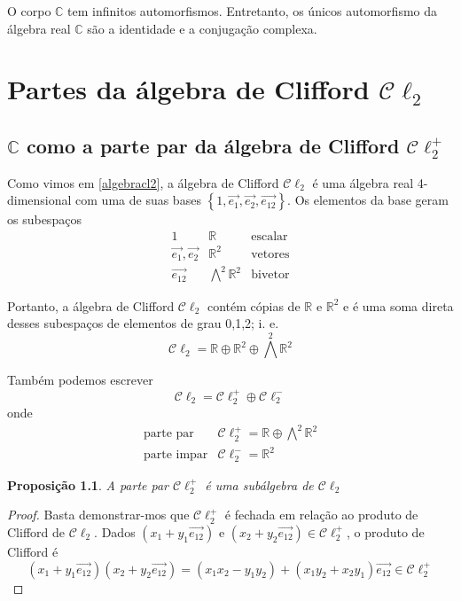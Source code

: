 \documentclass[12pt, oneside, a4paper, english, brazil]{abntex2}
\providecommand{\p}[1]{\left( #1 \right)}
\providecommand{\chaves}[1]{\left\{ #1 \right\}}
\providecommand{\R}{\mathbb{R}}
\providecommand{\Rdois}{\mathbb{R}^2}
\newcommand{\C}{\mathbb{C}}
\providecommand{\Cldois}{\mathcal{C}\ell_2}
\providecommand{\Cldoispar}{\mathcal{C}\ell_2^{+}}
\providecommand{\Cldoisimpar}{\mathcal{C}\ell_2^{-}}
\renewcommand{\vec}{\overrightarrow}
\newcounter{geral}
\theoremstyle{normal}
\newtheorem{proposition}[geral]{Proposição}
\theoremstyle{observacao}
\begin{document}
O corpo $\C$ tem infinitos automorfismos. Entretanto, os únicos automorfismo da álgebra real $\C$ são a identidade e a conjugação complexa.

\chapter{Partes da álgebra de Clifford $\Cldois$}\label{partesdecl2}

\section{$\C$ como a parte par da álgebra de Clifford $\Cldoispar$}\label{ccomopartedecldois}

Como vimos em \ref{algebracl2}, a álgebra de Clifford $\Cldois$ é uma álgebra real 4-dimensional com uma de suas bases $\chaves{1, \vec{e_1}, \vec{e_2}, \vec{e_{12}}}$. Os elementos da base geram os subespaços
\[
\begin{array}{rcl}
1& \R & \text{escalar} \\
\vec{e_1}, \vec{e_2}& \Rdois & \text{vetores} \\
\vec{e_{12}}& \bigwedge^2 \Rdois & \text{bivetor}
\end{array}
\]

Portanto, a álgebra de Clifford $\Cldois$ contém cópias de $\R$ e $\Rdois$ e é uma soma direta desses subespaços de elementos de grau 0,1,2; i. e.
\[
\Cldois = \R \oplus \Rdois \oplus \bigwedge^2 \Rdois
\]

Também podemos escrever 
\[
\Cldois = \Cldoispar \oplus \Cldoisimpar
\]
onde 
\[
\begin{array}{rl}
\text{parte par}& \Cldoispar = \R \oplus \bigwedge^2 \Rdois\\
\text{parte impar}& \Cldoisimpar = \Rdois 
\end{array}
\]


\begin{proposition}\label{subalgebracldoispar}
A parte par $\Cldoispar$ é uma subálgebra de $\Cldois$
\end{proposition}
\begin{proof}
Basta demonstrar-mos que $\Cldoispar$ é fechada em relação ao produto de Clifford de $\Cldois$. Dados $\p{x_1+y_1\vec{e_{12}}}$ e $\p{x_2+y_2\vec{e_{12}}} \in \Cldoispar$, o produto de Clifford é 
\[
\p{x_1+y_1\vec{e_{12}}}\p{x_2+y_2\vec{e_{12}}} = \p{x_1x_2-y_1y_2}+\p{x_1y_2+x_2y_1}\vec{e_{12}} \in \Cldoispar
\]
\end{proof}
\end{document}
